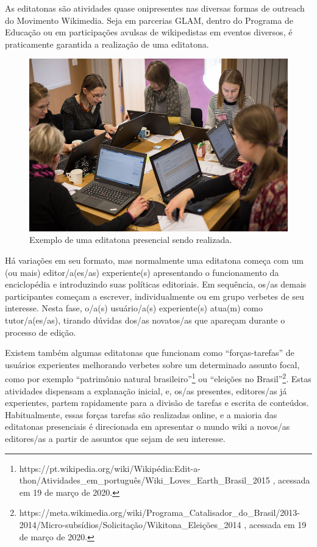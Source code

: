 As editatonas são atividades quase onipresentes nas diversas formas de outreach do Movimento Wikimedia. Seja em parcerias GLAM, \citep{robichaud_wikipedia_2017} dentro do Programa de Educação \citep{marques_wikipedia_2013} ou em participações avulsas de wikipedistas em eventos diversos\citep{campany_using_2018}, é praticamente garantida a realização de uma editatona.

\begin{figure}[H]
    \centering
    \includegraphics[width=1\textwidth]{Images/editatona_antiga.jpg}
    \caption{Exemplo de uma editatona presencial sendo realizada.}
    \label{fig:editatona_antiga}
\end{figure}

Há variações em seu formato, mas normalmente uma editatona começa com um (ou mais) editor/a(es/as) experiente(s) apresentando o funcionamento da enciclopédia e introduzindo suas políticas editoriais. Em sequência, os/as demais participantes começam a escrever, individualmente ou em grupo verbetes de seu interesse. Nesta fase, o/a(s) usuário/a(s) experiente(s) atua(m) como tutor/a(es/as), tirando dúvidas dos/as novatos/as que apareçam durante o processo de edição.

Existem também algumas editatonas que funcionam como ``forças-tarefas'' de usuários experientes melhorando verbetes sobre um determinado assunto focal, como por exemplo ``patrimônio natural brasileiro''\footnote{https://pt.wikipedia.org/wiki/Wikipédia:Edit-a-thon/Atividades\_em\_português/Wiki\_Loves\_Earth\_Brasil\_2015 , acessada em 19 de março de 2020.} ou ``eleições no Brasil''\footnote{https://meta.wikimedia.org/wiki/Programa\_Catalisador\_do\_Brasil/2013-2014/Micro-subsídios/Solicitação/Wikitona\_Eleições\_2014 , acessada em 19 de março de 2020.}. Estas atividades dispensam a explanação inicial, e, os/as presentes, editores/as já experientes, partem rapidamente para a divisão de tarefas e escrita de conteúdos. Habitualmente, essas forças tarefas são realizadas online, e a maioria das editatonas presenciais é direcionada em apresentar o mundo wiki a novos/as editores/as a partir de assuntos que sejam de seu interesse.

